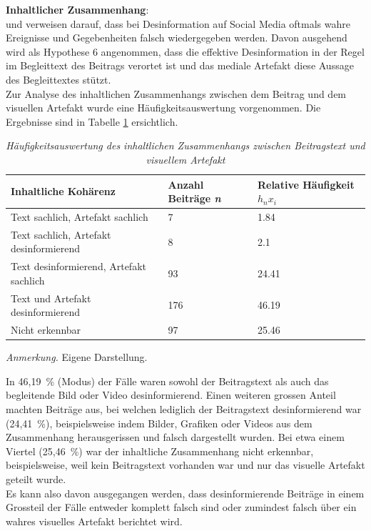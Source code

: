 \documentclass[12pt,a4paper]{article}        %
\begin{document}
\textbf{Inhaltlicher Zusammenhang}:\\
\Textcite[15]{bradshaw_industrialized_2021} und \textcite[3700]{weikmann_visual_2023} verweisen darauf, dass bei Desinformation auf Social Media oftmals wahre Ereignisse und Gegebenheiten falsch wiedergegeben werden.
Davon ausgehend wird als Hypothese 6 angenommen, dass die effektive Desinformation in der Regel im Begleittext des Beitrags verortet ist und das mediale Artefakt diese Aussage des Begleittextes stützt. \\

Zur Analyse des inhaltlichen Zusammenhangs zwischen dem Beitrag und dem visuellen Artefakt wurde eine Häufigkeitsauswertung vorgenommen. Die Ergebnisse sind in Tabelle \ref{tab:results_visual_coherence_table} ersichtlich.

\begin{table}[H]
  \caption{\textit{Häufigkeitsauswertung des inhaltlichen Zusammenhangs zwischen Beitragstext und visuellem Artefakt}}
  \label{tab:results_visual_coherence_table}
  \centering
  \begin{tabular}{|l|l|l|}\hline
    \textbf{Inhaltliche Kohärenz}&  \textbf{Anzahl Beiträge \textit{n}}& \textbf{Relative Häufigkeit \({h_n}{x_i}\)}\\\hline
    Text sachlich, Artefakt sachlich&  7& 1.84\\\hline
    Text sachlich, Artefakt desinformierend&  8& 2.1\\\hline
    Text desinformierend, Artefakt sachlich&  93& 24.41\\\hline
    Text und Artefakt desinformierend&  176& 46.19\\\hline
    Nicht erkennbar&  97& 25.46\\ \hline
  \end{tabular}
  \footnotesize\textit{Anmerkung.} Eigene Darstellung.
\end{table}
In 46,19 \% (Modus) der Fälle waren sowohl der Beitragstext als auch das begleitende Bild oder Video desinformierend. Einen weiteren grossen Anteil machten Beiträge aus, bei welchen lediglich der Beitragstext desinformierend war (24,41 \%), beispielsweise indem Bilder, Grafiken oder Videos aus dem Zusammenhang herausgerissen und falsch dargestellt wurden. Bei etwa einem Viertel (25,46 \%) war der inhaltliche Zusammenhang nicht erkennbar, beispielsweise, weil kein Beitragstext vorhanden war und nur das visuelle Artefakt geteilt wurde.\\
 Es kann also davon ausgegangen werden, dass desinformierende Beiträge in einem Grossteil der Fälle entweder komplett falsch sind oder zumindest falsch über ein wahres visuelles Artefakt berichtet wird.
\end{document}
